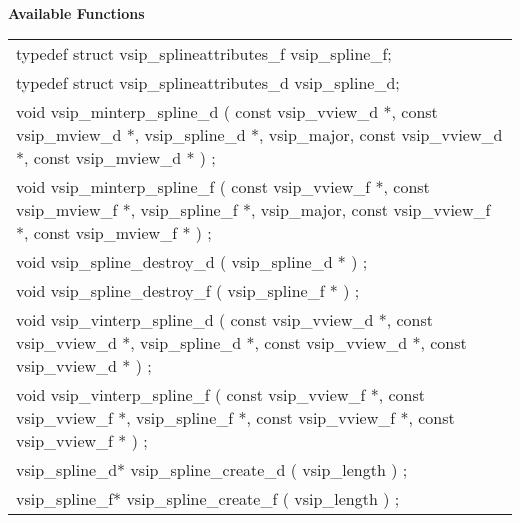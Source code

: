 \\\cvsiplh
\newline \hspace*{.8cm} \vspace*{.1cm} \textbf{Available Functions }
\newline \hspace*{1.1cm} {
\ttfamily
\begin{tabular}[H]{l}
typedef struct vsip\_splineattributes\_f vsip\_spline\_f;\\
typedef struct vsip\_splineattributes\_d vsip\_spline\_d; \\
void vsip\_minterp\_spline\_d ( const vsip\_vview\_d *, const vsip\_mview\_d *, vsip\_spline\_d *, vsip\_major, const vsip\_vview\_d *, const vsip\_mview\_d * ) ;\\
void vsip\_minterp\_spline\_f ( const vsip\_vview\_f *, const vsip\_mview\_f *, vsip\_spline\_f *, vsip\_major, const vsip\_vview\_f *, const vsip\_mview\_f * ) ;\\
void vsip\_spline\_destroy\_d ( vsip\_spline\_d * ) ;\\
void vsip\_spline\_destroy\_f ( vsip\_spline\_f * ) ;\\
void vsip\_vinterp\_spline\_d ( const vsip\_vview\_d *, const vsip\_vview\_d *, vsip\_spline\_d *, const vsip\_vview\_d *, const vsip\_vview\_d * ) ;\\
void vsip\_vinterp\_spline\_f ( const vsip\_vview\_f *, const vsip\_vview\_f *, vsip\_spline\_f *, const vsip\_vview\_f *, const vsip\_vview\_f * ) ;\\
vsip\_spline\_d* vsip\_spline\_create\_d ( vsip\_length ) ;\\
vsip\_spline\_f* vsip\_spline\_create\_f ( vsip\_length ) ;\\
\end{tabular}
}
\\\pyjvsiph
{}
